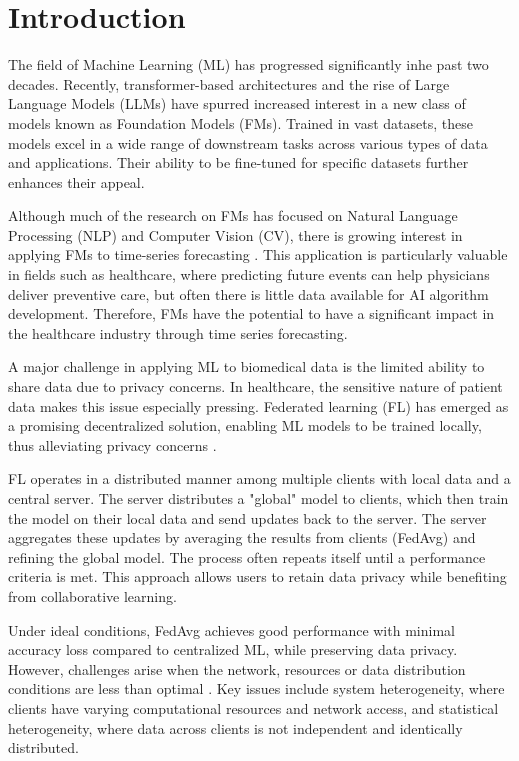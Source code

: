 \section{Introduction}
The field of Machine Learning (ML) has progressed significantly inhe past two decades. 
Recently, transformer-based architectures and the rise of Large Language Models (LLMs) have spurred increased interest in a new class of models known as Foundation Models (FMs). 
Trained in vast datasets, these models excel in a wide range of downstream tasks across various types of data and applications. 
Their ability to be fine-tuned for specific datasets further enhances their appeal.

Although much of the research on FMs has focused on Natural Language Processing (NLP) and Computer Vision (CV), there is growing interest in applying FMs to time-series forecasting \cite{chronos} \cite{lagllama} \cite{timesFM}. 
This application is particularly valuable in fields such as healthcare, where predicting future events can help physicians deliver preventive care, but often there is little data available for AI algorithm development. 
Therefore, FMs have the potential to have a significant impact in the healthcare industry through time series forecasting.

A major challenge in applying ML to biomedical data is the limited ability to share data due to privacy concerns. 
In healthcare, the sensitive nature of patient data makes this issue especially pressing. 
Federated learning (FL) has emerged as a promising decentralized solution, enabling ML models to be trained locally, thus alleviating privacy concerns \cite{fl}.

FL operates in a distributed manner among multiple clients with local data and a central server. The server distributes a "global" model to clients, which then train the model on their local data and send updates back to the server. The server aggregates these updates by averaging the results from clients (FedAvg) and refining the global model. The process often repeats itself until a performance criteria is met. This approach allows users to retain data privacy while benefiting from collaborative learning.

Under ideal conditions, FedAvg achieves good performance with minimal accuracy loss compared to centralized ML, while preserving data privacy. 
However, challenges arise when the network, resources or data distribution conditions are less than optimal \cite{ye2023heterogeneous}. 
Key issues include system heterogeneity, where clients have varying computational resources and network access, and statistical heterogeneity, where data across clients is not independent and identically distributed.

